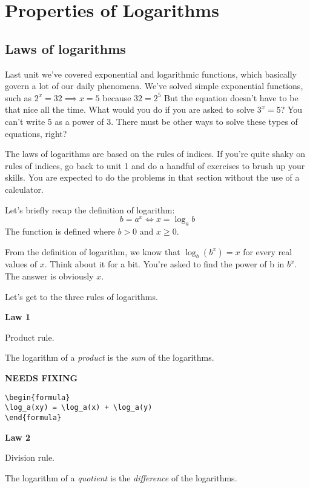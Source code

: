 \documentclass[../../main.tex]{subfiles}
\begin{document}
\chapter{Properties of Logarithms}

\section{Laws of logarithms}
Last unit we've covered exponential and logarithmic functions, which basically govern a lot of our daily phenomena. We've solved simple exponential functions, such as $2^x=32\implies x=5$ because $32=2^5$
But the equation doesn't have to be that nice all the time. What would you do if you are asked to solve $3^x=5$? You can't write 5 as a power of 3. There must be other ways to solve these types of equations, right?

The laws of logarithms are based on the rules of indices. If you're quite shaky on rules of indices, go back to unit 1 and do a handful of exercises to brush up your skills. You are expected to do the problems in that section without the use of a calculator.

Let's briefly recap the definition of logarithm:
\[b=a^x \iff x=\log_ab\]
The function is defined where $b>0$ and $x\geq 0$.

From the definition of logarithm, we know that $\log_b(b^x)=x$ for every real values of $x$.
Think about it for a bit. You're asked to find the power of b in $b^x$. The answer is obviously $x$.

Let's get to the three rules of logarithms.

\vspace{5mm}
\par\textbf{Law 1}
\par Product rule.
\par The logarithm of a \textit{product} is the \textit{sum} of the logarithms.

{\hfill\Large\bfseries NEEDS FIXING\hfill}
\begin{lstlisting}
\begin{formula}
\log_a(xy) = \log_a(x) + \log_a(y)
\end{formula}
 \end{lstlisting}


\vspace{5mm}
\par\textbf{Law 2}
\par Division rule.
\par The logarithm of a \textit{quotient} is the \textit{difference} of the logarithms.
\end{document}
